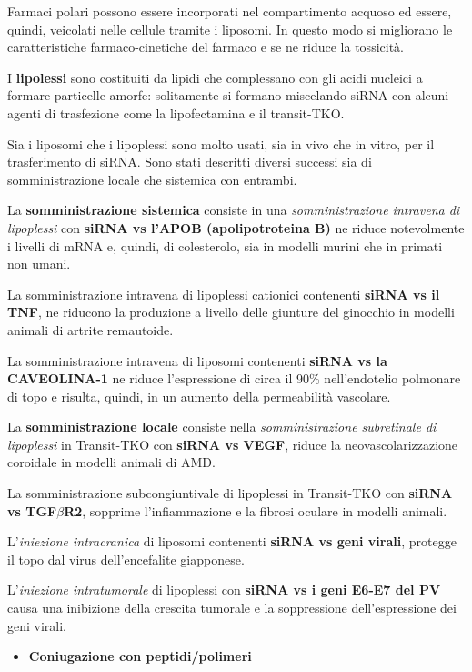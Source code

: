 \documentclass[11pt]{book}
\begin{document}
Farmaci polari possono essere incorporati nel compartimento acquoso ed
essere, quindi, veicolati nelle cellule tramite i liposomi. In questo
modo si migliorano le caratteristiche farmaco-cinetiche del farmaco e se
ne riduce la tossicità.

I \textbf{lipolessi} sono costituiti da lipidi che complessano con gli
acidi nucleici a formare particelle amorfe: solitamente si formano
miscelando siRNA con alcuni agenti di trasfezione come la lipofectamina
e il transit-TKO.

Sia i liposomi che i lipoplessi sono molto usati, sia in vivo che in
vitro, per il trasferimento di siRNA. Sono stati descritti diversi
successi sia di somministrazione locale che sistemica con entrambi.

La \textbf{somministrazione sistemica} consiste in una
\emph{somministrazione intravena di lipoplessi} con \textbf{siRNA vs
l'APOB (apolipotroteina B)} ne riduce notevolmente i livelli di mRNA e,
quindi, di colesterolo, sia in modelli murini che in primati non umani.

La somministrazione intravena di lipoplessi cationici contenenti
\textbf{siRNA vs il TNF}, ne riducono la produzione a livello delle
giunture del ginocchio in modelli animali di artrite remautoide.

La somministrazione intravena di liposomi contenenti \textbf{siRNA vs la
CAVEOLINA-1} ne riduce l'espressione di circa il 90\% nell'endotelio
polmonare di topo e risulta, quindi, in un aumento della permeabilità
vascolare.

La \textbf{somministrazione locale} consiste nella
\emph{somministrazione subretinale di lipoplessi} in Transit-TKO con
\textbf{siRNA vs VEGF}, riduce la neovascolarizzazione coroidale in
modelli animali di AMD.

La somministrazione subcongiuntivale di lipoplessi in Transit-TKO con
\textbf{siRNA vs TGF\(\beta\)R2}, sopprime l'infiammazione e la fibrosi
oculare in modelli animali.

L'\emph{iniezione intracranica} di liposomi contenenti \textbf{siRNA vs
geni virali}, protegge il topo dal virus dell'encefalite giapponese.

L'\emph{iniezione intratumorale} di lipoplessi con \textbf{siRNA vs i
geni E6-E7 del PV} causa una inibizione della crescita tumorale e la
soppressione dell'espressione dei geni virali.

\begin{itemize}
\itemsep1pt\parskip0pt
\item
  \textbf{Coniugazione con peptidi/polimeri}
\end{itemize}
\end{document}

